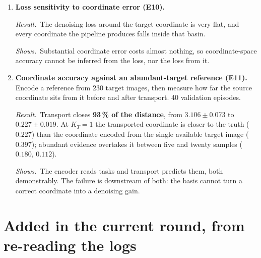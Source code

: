 \documentclass[11pt]{article}
\newcommand{\res}{\par\smallskip\textit{Result.}\ }
\newcommand{\shows}{\par\smallskip\textit{Shows.}\ }
\newcommand{\KT}{K_{T}}
\begin{document}
\begin{enumerate}
\item \textbf{Loss sensitivity to coordinate error (E10).}
\res The denoising loss around the target coordinate is very flat, and every coordinate
the pipeline produces falls inside that basin.
\shows Substantial coordinate error costs almost nothing, so coordinate-space accuracy
cannot be inferred from the loss, nor the loss from it.

\item \textbf{Coordinate accuracy against an abundant-target reference (E11).}
Encode a reference from 230 target images, then measure how far the source coordinate sits
from it before and after transport. 40 validation episodes.
\res Transport closes \textbf{93\,\% of the distance}, from $3.106 \pm 0.073$ to $0.227
\pm 0.019$. At $\KT = 1$ the transported coordinate is closer to the truth ($0.227$) than
the coordinate encoded from the single available target image ($0.397$); abundant evidence
overtakes it between five and twenty samples ($0.180$, $0.112$).
\shows The encoder reads tasks and transport predicts them, both demonstrably. The failure
is downstream of both: the basis cannot turn a correct coordinate into a denoising gain.

\end{enumerate}

\section{Added in the current round, from re-reading the logs}
\end{document}
